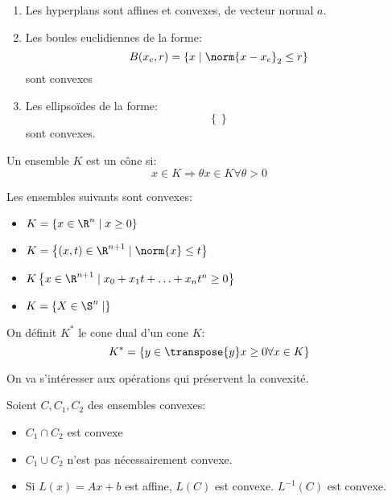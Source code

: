 \documentclass[math]{cours}
\begin{document}
\begin{proposition}
	\begin{enumerate}
		\item Les hyperplans sont affines et convexes, de vecteur normal $a$.
		\item Les boules euclidiennes de la forme:
		      \begin{equation*}
			      B(x_{c}, r) = \left\{ x \mid \norm{x - x_{c}}_{2} \leq r \right\}
		      \end{equation*}
		      sont convexes
		\item Les ellipsoïdes de la forme:
		      \begin{equation*}
			      \left\{  \right\}
		      \end{equation*}
		      sont convexes.
	\end{enumerate}
\end{proposition}

\begin{definition}
	Un ensemble $K$ est un cône si:
	\begin{equation*}
		x \in K \Rightarrow \theta x \in K \forall \theta > 0
	\end{equation*}
\end{definition}

\begin{proposition}
	Les ensembles suivants sont convexes:
	\begin{itemize}
		\item $K = \left\{ x \in \R^{n} \mid x \geq 0 \right\}$
		\item $K = \left\{ (x, t) \in \R^{n + 1} \mid \norm{x} \leq t \right\}$
		\item $K \left\{ x \in \R^{n + 1}\mid x_{0} + x_{1}t + \ldots + x_{n} t^{n} \geq 0 \right\}$
		\item $K = \left\{ X \in \S^{n} \mid \right\}$
	\end{itemize}
\end{proposition}

\begin{definition}
	On définit $K^{*}$ le cone dual d'un cone $K$:
	\begin{equation*}
		K^{*} = \left\{ y \in \transpose{y}x \geq 0 \forall x \in K \right\}
	\end{equation*}
	\label{def:conedual}
\end{definition}

On va s'intéresser aux opérations qui préservent la convexité.

\begin{proposition}
	Soient $C, C_{1}, C_{2}$ des ensembles convexes:
	\begin{itemize}
		\item $C_{1} \cap C_{2}$ est convexe
		\item $C_{1} \cup C_{2}$ n'est pas nécessairement convexe.
		\item Si $L(x) = Ax + b$ est affine, $L(C)$ est convexe. $L^{-1}(C)$ est convexe.
	\end{itemize}
\end{proposition}
\end{document}

